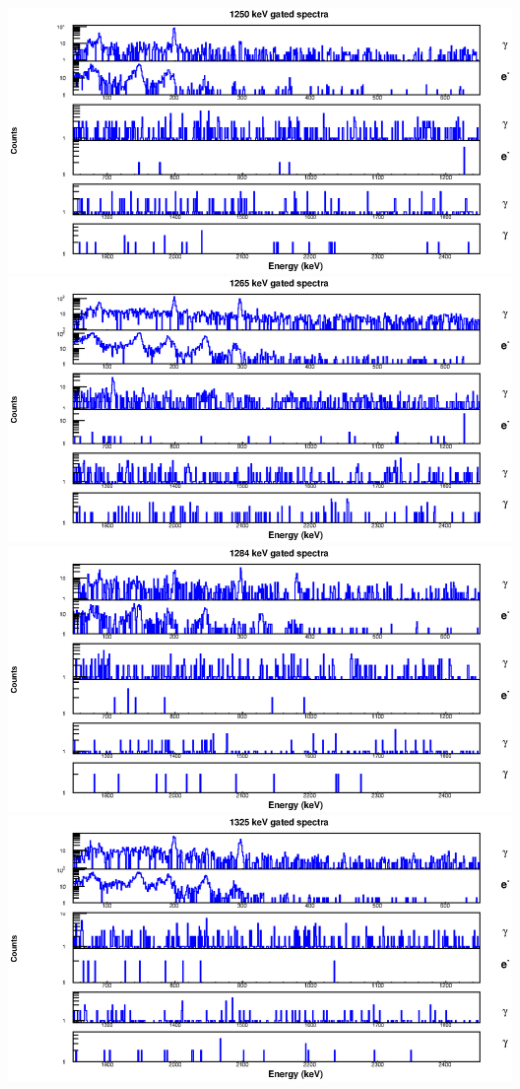 \begin{landscape}
\includegraphics[scale=1.2]{156Gd_Appendix/1250_combined.eps}
\includegraphics[scale=1.2]{156Gd_Appendix/1265_combined.eps}
\includegraphics[scale=1.2]{156Gd_Appendix/1284_combined.eps}
\includegraphics[scale=1.2]{156Gd_Appendix/1325_combined.eps}

\end{landscape}
